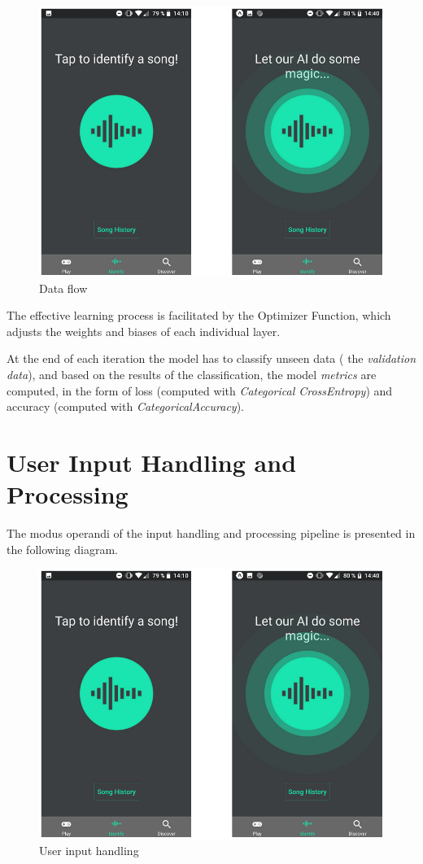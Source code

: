 \begin{figure}[H]
	\centering
	\includegraphics{images/spektrum.png}
	\caption{Data flow}
\label{data_flow}
\end{figure}


The effective learning process is facilitated by the Optimizer Function, which adjusts the weights and biases of each individual
layer.

At the end of each iteration the model has to classify unseen data ( the \textit{validation data}), and based on the results of
the classification, the model \textit{metrics} are computed, in the form of loss (computed with \textit{Categorical CrossEntropy})
and accuracy (computed with \textit{CategoricalAccuracy}).


\section{User Input Handling and Processing}

The modus operandi of the input handling and processing pipeline is presented in the following diagram.

\begin{figure}[H]
	\centering
	\includegraphics{images/spektrum.png}
	\caption{User input handling}
\label{mo}
\end{figure}

